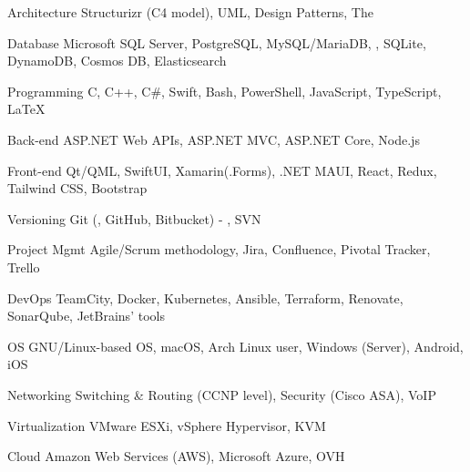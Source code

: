 

\begin{cvskills}

  \cvskill
    {Architecture}
    {Structurizr (C4 model), UML, Design Patterns, The }

  \cvskill
    {Database}
    {Microsoft SQL Server, PostgreSQL, MySQL/MariaDB, , SQLite, DynamoDB, Cosmos DB, Elasticsearch}

  \cvskill
    {Programming}
    {C, C++, C\#, Swift, Bash, PowerShell, JavaScript, TypeScript, \LaTeX}

  \cvskill
    {Back-end}
    {ASP.NET Web APIs, ASP.NET MVC, ASP.NET Core, Node.js}

  \cvskill
    {Front-end}
    {Qt/QML, SwiftUI, Xamarin(.Forms), .NET MAUI, React, Redux, Tailwind CSS, Bootstrap}

  \cvskill
    {Versioning}
    {Git (, GitHub, Bitbucket) - , SVN}

  \cvskill
    {Project Mgmt}
    {Agile/Scrum methodology, Jira, Confluence, Pivotal Tracker, Trello}

  \cvskill
    {DevOps}
    {TeamCity, Docker, Kubernetes, Ansible, Terraform, Renovate, SonarQube, JetBrains' tools}

  \cvskill
    {OS}
    {GNU/Linux-based OS, macOS, Arch Linux user, Windows (Server), Android, iOS}

  \cvskill
    {Networking}
    {Switching \& Routing (CCNP level), Security (Cisco ASA), VoIP}

  \cvskill
    {Virtualization}
    {VMware ESXi, vSphere Hypervisor, KVM}

  \cvskill
    {Cloud}
    {Amazon Web Services (AWS), Microsoft Azure, OVH}

\end{cvskills}

